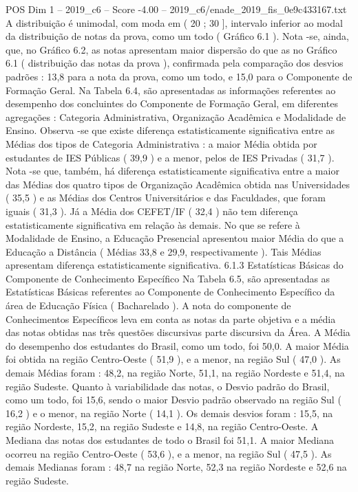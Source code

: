 \begin{textsample}{POS Dim 1 – 2019\_c6 – Score -4.00 – 2019\_c6/enade\_2019\_fis\_0e9c433167.txt}
A distribuição é unimodal, com moda em ( 20 ; 30 ], intervalo inferior ao modal da distribuição de notas da prova, como um todo ( Gráfico 6.1 ).
Nota -se, ainda, que, no Gráfico 6.2, as notas apresentam maior dispersão do que as no Gráfico 6.1 ( distribuição das notas da prova ), confirmada pela comparação dos desvios padrões : 13,8 para a nota da prova, como um todo, e 15,0 para o Componente de Formação Geral.
Na Tabela 6.4, são apresentadas as informações referentes ao desempenho dos concluintes do Componente de Formação Geral, em diferentes agregações : Categoria Administrativa, Organização Acadêmica e Modalidade de Ensino.
Observa -se que existe diferença estatisticamente significativa entre as Médias dos tipos de Categoria Administrativa : a maior Média obtida por estudantes de IES Públicas ( 39,9 ) e a menor, pelos de IES Privadas ( 31,7 ).
Nota -se que, também, há diferença estatisticamente significativa entre a maior das Médias dos quatro tipos de Organização Acadêmica obtida nas Universidades ( 35,5 ) e as Médias dos Centros Universitários e das Faculdades, que foram iguais ( 31,3 ).
Já a Média dos CEFET/IF ( 32,4 ) não tem diferença estatisticamente significativa em relação às demais.
No que se refere à Modalidade de Ensino, a Educação Presencial apresentou maior Média do que a Educação a Distância ( Médias 33,8 e 29,9, respectivamente ).
Tais Médias apresentam diferença estatisticamente significativa. 6.1.3 Estatísticas Básicas do Componente de Conhecimento Específico Na Tabela 6.5, são apresentadas as Estatísticas Básicas referentes ao Componente de Conhecimento Específico da área de Educação Física ( Bacharelado ).
A nota do componente de Conhecimentos Específicos leva em conta as notas da parte objetiva e a média das notas obtidas nas três questões discursivas parte discursiva da Área.
A Média do desempenho dos estudantes do Brasil, como um todo, foi 50,0.
A maior Média foi obtida na região Centro-Oeste ( 51,9 ), e a menor, na região Sul ( 47,0 ).
As demais Médias foram : 48,2, na região Norte, 51,1, na região Nordeste e 51,4, na região Sudeste.
Quanto à variabilidade das notas, o Desvio padrão do Brasil, como um todo, foi 15,6, sendo o maior Desvio padrão observado na região Sul ( 16,2 ) e o menor, na região Norte ( 14,1 ).
Os demais desvios foram : 15,5, na região Nordeste, 15,2, na região Sudeste e 14,8, na região Centro-Oeste.
A Mediana das notas dos estudantes de todo o Brasil foi 51,1.
A maior Mediana ocorreu na região Centro-Oeste ( 53,6 ), e a menor, na região Sul ( 47,5 ).
As demais Medianas foram : 48,7 na região Norte, 52,3 na região Nordeste e 52,6 na região Sudeste.

\end{textsample}
